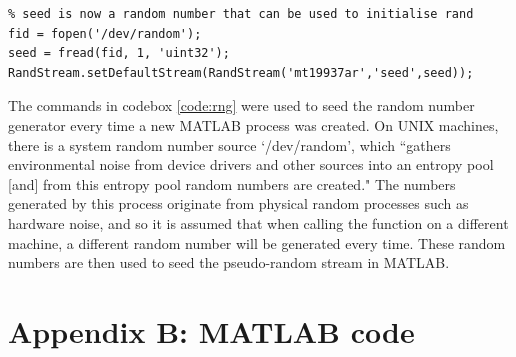 \documentclass[11pt]{article}
\numberwithin{equation}{subsection}
\begin{document}
\begin{lstlisting}[float=ht,style=Matlab-editor,caption = {Seeding random generator},label=code:rng]
% Ensures truly random numbers for each process
% seed is now a random number that can be used to initialise rand
fid = fopen('/dev/random');
seed = fread(fid, 1, 'uint32');
RandStream.setDefaultStream(RandStream('mt19937ar','seed',seed));
\end{lstlisting}

The commands in codebox \ref{code:rng} were used to seed the random number generator every time a new MATLAB process was created. On UNIX machines, there is a system random number source \mbox{`/dev/random'}, which ``gathers environmental noise from device drivers and other sources into an entropy pool [and] from this entropy pool random numbers are created." The numbers generated by this process originate from physical random processes such as hardware noise, and so it is assumed that when calling the function on a different machine, a different random number will be generated every time. These random numbers are then used to seed the pseudo-random stream in MATLAB.

{}
\section*{Appendix B: MATLAB code}

\printbibliography
\end{document}
